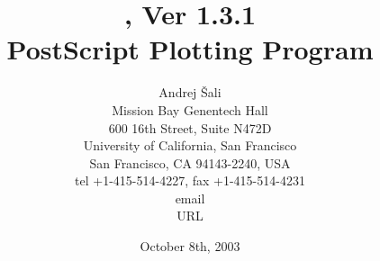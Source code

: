 \title{\vspace{3cm} \ASGL, Ver 1.3.1 \\[1cm]
       PostScript Plotting Program \\[3cm]}

\author{Andrej \v{S}ali \\[0.5cm]
Mission Bay Genentech Hall \\
600 16th Street, Suite N472D \\
University of California, San Francisco \\
San Francisco, CA 94143-2240, USA \\
tel +1-415-514-4227, fax +1-415-514-4231  \\
email  \\
URL 
}

\date{October 8th, 2003}
